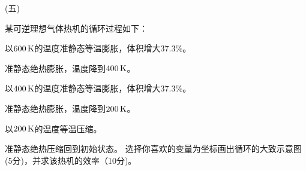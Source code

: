 \documentclass[12pt,CJK]{article}
\begin{document}
  \item[(五)]{某可逆理想气体热机的循环过程如下：
      \bitem
    \item{以$600\,\mathrm{K}$的温度准静态等温膨胀，体积增大$37.3\%$。}
    \item{准静态绝热膨胀，温度降到$400\,\mathrm{K}$。}
    \item{以$400\,\mathrm{K}$的温度准静态等温膨胀，体积增大$37.3\%$。}      
    \item{准静态绝热膨胀，温度降到$200\,\mathrm{K}$。}
    \item{以$200\,\mathrm{K}$的温度等温压缩。}
    \item{准静态绝热压缩回到初始状态。}            
      \eitem
      选择你喜欢的变量为坐标画出循环的大致示意图(5分)，并求该热机的效率（10分)。
    }
\eitem


\ech
\end{document}
